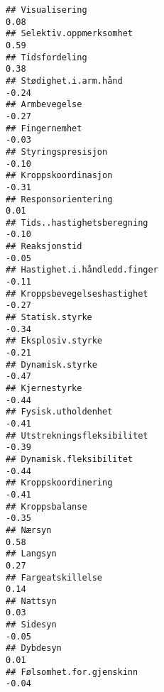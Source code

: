 \documentclass[
]{article}
\begin{document}
\begin{verbatim}
## Visualisering                                                                     0.08
## Selektiv.oppmerksomhet                                                            0.59
## Tidsfordeling                                                                     0.38
## Stødighet.i.arm.hånd                                                             -0.24
## Armbevegelse                                                                     -0.27
## Fingernemhet                                                                     -0.03
## Styringspresisjon                                                                -0.10
## Kroppskoordinasjon                                                               -0.31
## Responsorientering                                                                0.01
## Tids..hastighetsberegning                                                        -0.10
## Reaksjonstid                                                                     -0.05
## Hastighet.i.håndledd.finger                                                      -0.11
## Kroppsbevegelseshastighet                                                        -0.27
## Statisk.styrke                                                                   -0.34
## Eksplosiv.styrke                                                                 -0.21
## Dynamisk.styrke                                                                  -0.47
## Kjernestyrke                                                                     -0.44
## Fysisk.utholdenhet                                                               -0.41
## Utstrekningsfleksibilitet                                                        -0.39
## Dynamisk.fleksibilitet                                                           -0.44
## Kroppskoordinering                                                               -0.41
## Kroppsbalanse                                                                    -0.35
## Nærsyn                                                                            0.58
## Langsyn                                                                           0.27
## Fargeatskillelse                                                                  0.14
## Nattsyn                                                                           0.03
## Sidesyn                                                                          -0.05
## Dybdesyn                                                                          0.01
## Følsomhet.for.gjenskinn                                                          -0.04

\end{verbatim}
\end{document}
